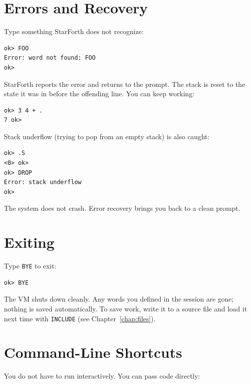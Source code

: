 \section{Errors and Recovery}
\label{sec:errors}

Type something StarForth does not recognize:

\begin{lstlisting}[language=Forth]
ok> FOO
Error: word not found: FOO
ok>
\end{lstlisting}

StarForth reports the error and returns to the prompt. The stack is reset to
the state it was in before the offending line. You can keep working:

\begin{lstlisting}[language=Forth]
ok> 3 4 + .
7 ok>
\end{lstlisting}

Stack underflow (trying to pop from an empty stack) is also caught:

\begin{lstlisting}[language=Forth]
ok> .S
<0> ok>
ok> DROP
Error: stack underflow
ok>
\end{lstlisting}

The system does not crash. Error recovery brings you back to a clean prompt.

\section{Exiting}
\label{sec:bye}

Type \texttt{BYE} to exit:

\begin{lstlisting}[language=Forth]
ok> BYE
\end{lstlisting}

The VM shuts down cleanly. Any words you defined in the session are gone;
nothing is saved automatically. To save work, write it to a source file and
load it next time with \texttt{INCLUDE} (see Chapter~\ref{chap:files}).

\section{Command-Line Shortcuts}
\label{sec:cli}

You do not have to run interactively. You can pass code directly:

